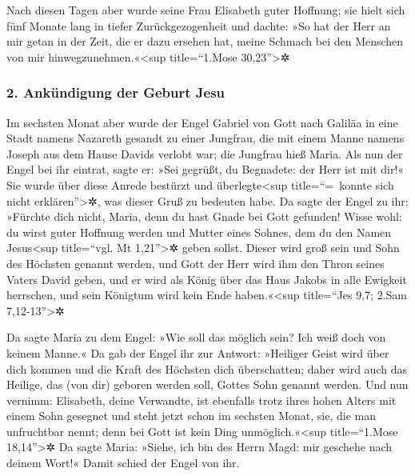  Nach diesen Tagen aber wurde seine Frau Elisabeth guter
Hoffnung; sie hielt sich fünf Monate lang in tiefer Zurückgezogenheit
und dachte:  »So hat der Herr an mir getan in der Zeit,
die er dazu ersehen hat, meine Schmach bei den Menschen von mir
hinwegzunehmen.«\textless sup title=``1.Mose 30,23''\textgreater✲

\hypertarget{ankuxfcndigung-der-geburt-jesu}{%
\subsubsection{2. Ankündigung der Geburt
Jesu}\label{ankuxfcndigung-der-geburt-jesu}}

 Im sechsten Monat aber wurde der Engel Gabriel von Gott
nach Galiläa in eine Stadt namens Nazareth gesandt  zu
einer Jungfrau, die mit einem Manne namens Joseph aus dem Hause Davids
verlobt war; die Jungfrau hieß Maria.  Als nun der Engel
bei ihr eintrat, sagte er: »Sei gegrüßt, du Begnadete: der Herr ist mit
dir!«  Sie wurde über diese Anrede bestürzt und
überlegte\textless sup title=``=~konnte sich nicht
erklären''\textgreater✲, was dieser Gruß zu bedeuten habe.
 Da sagte der Engel zu ihr: »Fürchte dich nicht, Maria,
denn du hast Gnade bei Gott gefunden!  Wisse wohl: du
wirst guter Hoffnung werden und Mutter eines Sohnes, dem du den Namen
Jesus\textless sup title=``vgl. Mt 1,21''\textgreater✲ geben sollst.
 Dieser wird groß sein und Sohn des Höchsten genannt
werden, und Gott der Herr wird ihm den Thron seines Vaters David geben,
 und er wird als König über das Haus Jakobs in alle
Ewigkeit herrschen, und sein Königtum wird kein Ende
haben.«\textless sup title=``Jes 9,7; 2.Sam 7,12-13''\textgreater✲

 Da sagte Maria zu dem Engel: »Wie soll das möglich sein?
Ich weiß doch von keinem Manne.«  Da gab der Engel ihr
zur Antwort: »Heiliger Geist wird über dich kommen und die Kraft des
Höchsten dich überschatten; daher wird auch das Heilige, das (von dir)
geboren werden soll, Gottes Sohn genannt werden.  Und nun
vernimm: Elisabeth, deine Verwandte, ist ebenfalls trotz ihres hohen
Alters mit einem Sohn gesegnet und steht jetzt schon im sechsten Monat,
sie, die man unfruchtbar nennt;  denn bei Gott ist kein
Ding unmöglich.«\textless sup title=``1.Mose 18,14''\textgreater✲
 Da sagte Maria: »Siehe, ich bin des Herrn Magd: mir
geschehe nach deinem Wort!« Damit schied der Engel von ihr.

